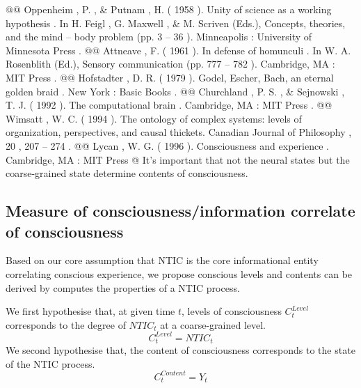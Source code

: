 \documentclass[utf8]{article}
\begin{document}
\begin{WritingMaterials}
				@@ Oppenheim , P. , \& Putnam , H. ( 1958 ). Unity of science as a working hypothesis . In H. Feigl , G. Maxwell , \& M. Scriven (Eds.), Concepts, theories, and the mind – body problem (pp. 3 – 36 ). Minneapolis : University of Minnesota Press .
				@@ Attneave , F. ( 1961 ). In defense of homunculi . In W. A. Rosenblith (Ed.), Sensory communication (pp. 777 – 782 ). Cambridge, MA : MIT Press .
				@@ Hofstadter , D. R. ( 1979 ). Godel, Escher, Bach, an eternal golden braid . New York : Basic Books .
				@@ Churchland , P. S. , \& Sejnowski , T. J. ( 1992 ). The computational brain . Cambridge, MA : MIT Press .
				@@ Wimsatt , W. C. ( 1994 ). The ontology of complex systems: levels of organization, perspectives, and causal thickets. Canadian Journal of Philosophy , 20 , 207 – 274 .
				@@ Lycan ,  W. G.  ( 1996 ).  Consciousness and experience .  Cambridge, MA :  MIT Press
			@ It's important that not the neural states but the coarse-grained state determine contents of consciousness.

        

		\end{WritingMaterials}


\rlend







		\subsection{Measure of consciousness/information correlate of consciousness}	
		Based on our core assumption that NTIC is the core informational entity correlating conscious experience, we propose conscious levels and contents can be derived by computes the properties of a NTIC process. \newline
		
		\noindent
		We first hypothesise that, at given time $t$, levels of consciousness $C_{t}^{Level}$ corresponds to the degree of  $NTIC_{t}$ at a coarse-grained level.
			\begin{equation}\label{eq:cLevel}
				C_{t}^{Level} = NTIC_{t}
			\end{equation}
		\newline
		\noindent
		We second hypothesise that, the content of consciousness corresponds to the state of the NTIC process.
			\begin{equation}\label{eq:cContent}
				C_{t}^{Content} = Y_{t}
			\end{equation}
		
\end{document}
